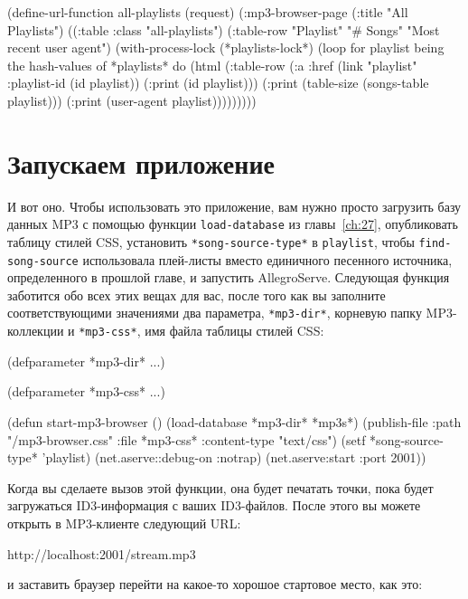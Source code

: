 \begin{myverb}
(define-url-function all-playlists (request)
  (:mp3-browser-page
   (:title "All Playlists")
   ((:table :class "all-playlists")
    (:table-row "Playlist" "# Songs" "Most recent user agent")
    (with-process-lock (*playlists-lock*)
      (loop for playlist being the hash-values of *playlists* do
           (html
             (:table-row
              (:a :href (link "playlist" :playlist-id (id playlist)) (:print (id playlist)))
              (:print (table-size (songs-table playlist)))
              (:print (user-agent playlist)))))))))
\end{myverb}

\section{Запускаем приложение}

И вот оно. Чтобы использовать это приложение, вам нужно просто загрузить базу данных MP3 с
помощью функции \lstinline{load-database} из главы~\ref{ch:27}, опубликовать таблицу
стилей CSS, установить \lstinline{*song-source-type*} в \lstinline{playlist}, чтобы
\lstinline{find-song-source} использовала плей-листы вместо единичного песенного источника,
определенного в прошлой главе, и запустить AllegroServe. Следующая функция заботится обо всех
этих вещах для вас, после того как вы заполните соответствующими значениями два
параметра, \lstinline{*mp3-dir*}, корневую папку MP3-коллекции и \lstinline{*mp3-css*}, имя файла
таблицы стилей CSS:

\begin{myverb}
(defparameter *mp3-dir* ...)

(defparameter *mp3-css* ...)

(defun start-mp3-browser ()
  (load-database *mp3-dir* *mp3s*)
  (publish-file :path "/mp3-browser.css"  :file *mp3-css* :content-type "text/css")
  (setf *song-source-type* 'playlist)
  (net.aserve::debug-on :notrap)
  (net.aserve:start :port 2001))
\end{myverb}

Когда вы сделаете вызов этой функции, она будет печатать точки, пока будет загружаться
ID3-информация с ваших ID3-файлов. После этого вы можете открыть в MP3-клиенте следующий
URL:

\begin{myverb}
  http://localhost:2001/stream.mp3
\end{myverb}

\noindent{}и заставить браузер перейти на какое-то хорошое стартовое место, как это:

